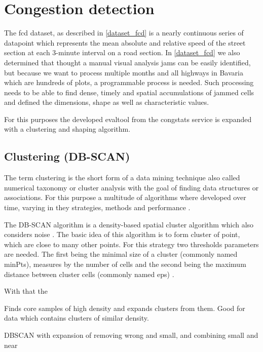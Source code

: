\documentclass[a4paper,12pt]{report}
\begin{document}
\section{Congestion detection}
The \acrshort{fcd} dataset, as described in \ref{dataset_fcd} is a nearly continuous series of datapoint which represents the mean absolute and relative speed of the street section at each 3-minute interval on a road section. In \ref{dataset_fcd} we also determined that thought a manual visual analysis jams can be easily identified, but because we want to process multiple months and all highways in Bavaria which are hundreds of plots, a programmable process is needed. Such processing needs to be able to find dense, timely and spatial accumulations of jammed cells and defined the dimensions, shape as well as characteristic values.
\par For this purposes the developed \gls{evaltool} from the \gls{congstats} service is expanded with a clustering and shaping algorithm.

\subsection{Clustering (DB-SCAN)}
The term clustering is the short form of a data mining technique also called numerical taxonomy or cluster analysis with the goal of finding data structures or associations. For this purpose a multitude of algorithms where developed over time, varying in they strategies, methods and performance \cite{Busch2004}. 
\par The DB-SCAN algorithm is a density-based spatial cluster algorithm which also considers noise  \cite{Chauhan2020}. The basic idea of this algorithm is to form cluster of point, which are close to many other points. For this strategy two thresholds parameters are needed. The first being the minimal size of a cluster (commonly named minPts), measures by the number of cells and the second being the maximum distance between cluster cells (commonly named eps) \cite{Scikit2020}. 
\par With that the 

Finds core samples of high density and expands clusters from them. Good for data which contains clusters of similar density.


DBSCAN with expansion of removing wrong and small, and combining small and near
%
\end{document}
